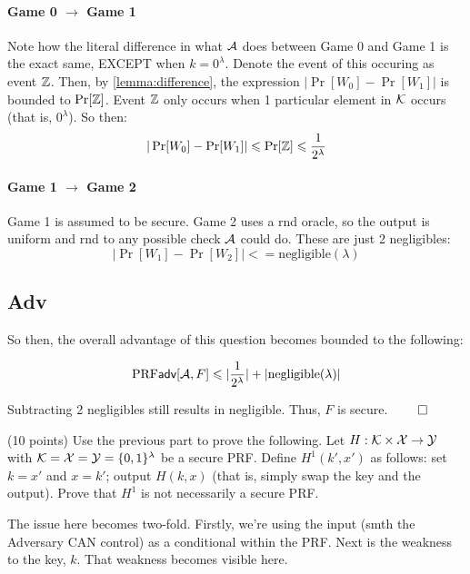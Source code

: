 \documentclass[12pt]{article}
\theoremstyle{plain}
\theoremstyle{definition}
\begin{document}
\begin{problem}
\begin{solution}
\paragraph{Game 0 $\to$ Game 1} Note how the literal difference in what $\mathcal{A}$ does between Game 0 and Game 1 is the exact same, EXCEPT when $k = 0^{\lambda}$.
Denote the event of this occuring as event $\mathbb{Z}$. Then, by \ref{lemma:difference}, the expression $|\Pr[W_0] - \Pr[W_1]|$ is bounded to $\Pr[\mathbb{Z}]$. 
Event $\mathbb{Z}$ only occurs when 1 particular element in $\mathcal{K}$ occurs (that is, $0^{\lambda}$). So then:
\begin{equation*}
  |\Pr[W_0] - \Pr[W_1]| \leqslant \Pr[\mathbb{Z}] \leqslant \frac{1}{2^{\lambda}}
\end{equation*}

\paragraph{Game 1 $\to$ Game 2} Game 1 is assumed to be secure. Game 2 uses a rnd oracle, so the output is uniform and rnd to any possible check $\mathcal{A}$ could do.
These are just 2 negligibles:
\begin{equation*}
  |\Pr[W_1] - \Pr[W_2]| <= \text{negligible}(\lambda)
\end{equation*}

\subsection*{Adv}
So then, the overall advantage of this question becomes bounded to the following:

\begin{equation*}
  \textrm{PRF}\textsf{adv}[\mathcal{A}, F] \leqslant |\frac{1}{2^{\lambda}}| + |\text{negligible}(\lambda)|
\end{equation*}

\noindent Subtracting 2 negligibles still results in negligible. Thus, $F$ is secure. $\qed$

\end{solution}


 \begin{ppart} (10 points)
Use the previous part to prove the following.  Let $H:\mathcal{K}\times \mathcal{X} \rightarrow \mathcal{Y}$ with $\mathcal{K}=\mathcal{X}=\mathcal{Y}=\{0,1\}^\lambda$ be a secure PRF. Define $H^1(k', x')$ as follows: set $k=x'$ and  $x=k'$; output $H(k, x)$ (that is, simply swap the key and the output). Prove that $H^1$ is not necessarily a secure PRF.
 
 \end{ppart}
\begin{solution}
The issue here becomes two-fold. Firstly, we're using the input (smth the Adversary CAN control) as a conditional within the PRF.
Next is the weakness to the key, $k$. That weakness becomes visible here.


\end{solution}
\end{problem}
\end{document}
